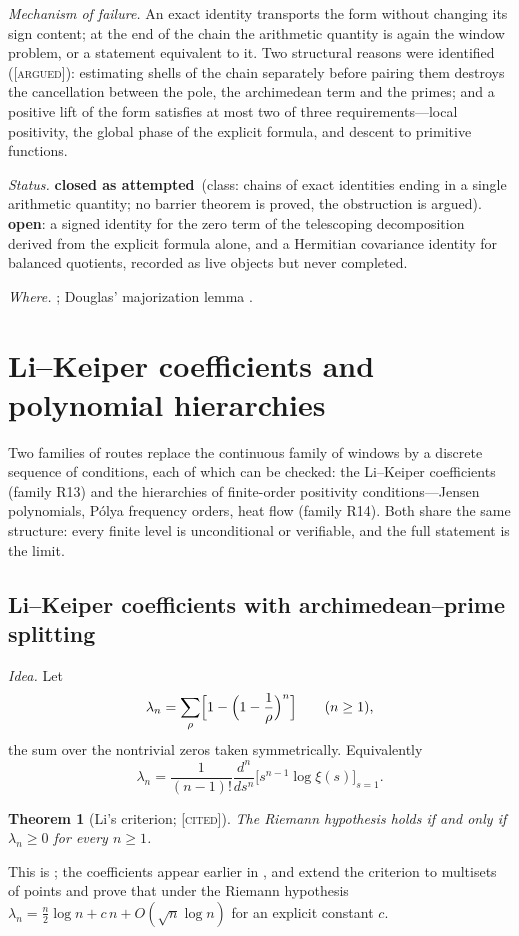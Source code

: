 \documentclass[11pt]{amsart}
\newtheorem{theorem}{Theorem}[section]
\theoremstyle{definition}
\theoremstyle{remark}
\numberwithin{equation}{section}
\newcommand{\stag}[1]{\textsc{[#1]}}
\newcommand{\CITED}{\stag{cited}}
\newcommand{\ARGUED}{\stag{argued}}
\newcommand{\rtag}[1]{\textbf{\small\textsf{#1}}}
\newcommand{\closedA}{\rtag{closed as attempted}}
\newcommand{\openR}{\rtag{open}}
\newcommand{\entry}[1]{\par\smallskip\noindent\textit{#1.}\enspace}
\begin{document}
\entry{Mechanism of failure} An exact identity transports the form without changing its sign
content; at the end of the chain the arithmetic quantity is again the window problem, or a
statement equivalent to it. Two structural reasons were identified (\ARGUED): estimating shells of
the chain separately before pairing them destroys the cancellation between the pole, the
archimedean term and the primes; and a positive lift of the form satisfies at most two of three
requirements---local positivity, the global phase of the explicit formula, and descent to primitive
functions.

\entry{Status} \closedA\ (class: chains of exact identities ending in a single arithmetic
quantity; no barrier theorem is proved, the obstruction is argued). \openR: a signed identity for
the zero term of the telescoping decomposition derived from the explicit formula alone, and a
Hermitian covariance identity for balanced quotients, recorded as live objects but never
completed.

\entry{Where} \cite[Section~9]{P36}; Douglas' majorization lemma \cite{Douglas1966}.


\section{Li--Keiper coefficients and polynomial hierarchies}\label{w6:sec:li}

Two families of routes replace the continuous family of windows by a discrete sequence of
conditions, each of which can be checked: the Li--Keiper coefficients (family R13) and the
hierarchies of finite-order positivity conditions---Jensen polynomials, P\'olya frequency orders,
heat flow (family R14). Both share the same structure: every finite level is unconditional or
verifiable, and the full statement is the limit.

\subsection{Li--Keiper coefficients with archimedean--prime splitting}\label{w6:fam:R13}

\entry{Idea} Let
\[
\lambda_n=\sum_\rho\Bigl[1-\Bigl(1-\frac1\rho\Bigr)^{n}\Bigr]\qquad(n\ge1),
\]
the sum over the nontrivial zeros taken symmetrically. Equivalently
\[
\lambda_n=\frac1{(n-1)!}\frac{d^n}{ds^n}\bigl[s^{n-1}\log\xi(s)\bigr]_{s=1}.
\]

\begin{theorem}[Li's criterion; \CITED]\label{w6:thm:li}
The Riemann hypothesis holds if and only if $\lambda_n\ge0$ for every $n\ge1$.
\end{theorem}
This is \cite{Li1997}; the coefficients appear earlier in \cite{Keiper1992}, and
\cite{BombieriLagarias1999} extend the criterion to multisets of points and prove that under the
Riemann hypothesis $\lambda_n=\frac n2\log n+c\,n+O(\sqrt n\log n)$ for an explicit constant $c$.
\end{document}
